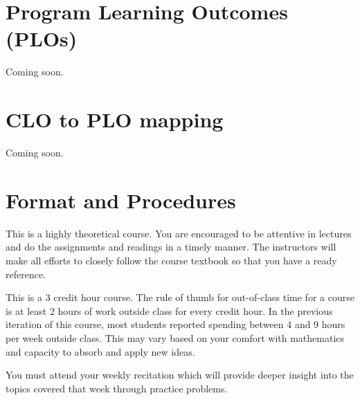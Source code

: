 \documentclass[a4paper]{article}
\begin{document}
\section{Program Learning Outcomes (PLOs) }

Coming soon.

\section{CLO to PLO mapping}

Coming soon.



\section{Format and Procedures}


This is a highly theoretical course. You are encouraged to be attentive in lectures and do the assignments and readings in a timely manner. The instructors will make all efforts to closely follow the course textbook so that you have a ready reference. 

This is a 3 credit hour course. The rule of thumb for out-of-class time for a course is at least 2 hours of work outside class for every credit hour. In the previous iteration of this course, most students reported spending between 4 and 9 hours per week outside class. This may vary based on your comfort with mathematics and capacity to absorb and apply new ideas.

You must attend your weekly recitation which will provide deeper insight into the topics covered that week through practice problems.
\end{document}
